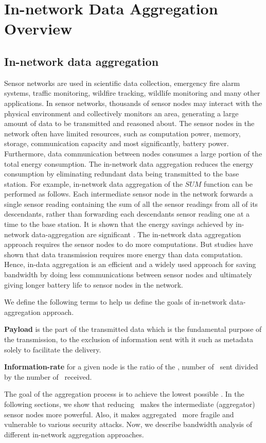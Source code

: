 \chapter{In-network Data Aggregation Overview} %
\label{cha:In-network Data-Aggregation Overview}

\section{In-network data aggregation}
	Sensor networks are used in scientific data collection, emergency fire alarm systems, traffic monitoring, wildfire tracking, wildlife monitoring and many other applications.
	In sensor networks, thousands of sensor nodes may interact with the physical environment and collectively monitors an area, generating a large amount of data to be transmitted and reasoned about.
	The sensor nodes in the network often have limited resources, such as computation power, memory, storage, communication capacity and most significantly, battery power.
	Furthermore, data communication between nodes consumes a large portion of the total energy consumption. 
	The in-network data aggregation reduces the energy consumption by eliminating redundant data being transmitted to the base station.
	For example, in-network data aggregation of the $\textit{SUM}$ function can be performed as follows. 
	Each intermediate sensor node in the network forwards a single sensor reading containing the sum of all the sensor readings from all of its descendants, rather than forwarding each descendants sensor reading one at a time to the base station.
	It is shown that the energy savings achieved by in-network data-aggregation are significant \cite{madden2002tag}.
	The in-network data aggregation approach requires the sensor nodes to do more computations.
	But studies have shown that data transmission requires more energy than data computation. 
	Hence, in-data aggregation is an efficient and a widely used approach for saving bandwidth by doing less communications between sensor nodes and ultimately giving longer battery life to sensor nodes in the network.

	We define the following terms to help us define the goals of in-network data-aggregation approach.
	\begin{definition}\label{def:payload}\cite{PayloadWiKi}
		\textbf{Payload} is the part of the transmitted data which is the fundamental purpose of the transmission, to the exclusion of information sent with it such as metadata solely to facilitate the delivery.
	\end{definition}
	\begin{definition}\label{def:information-rate}
		\textbf{Information-rate} for a given node is the ratio of the \payloads, number of \payloads\ sent divided by the number of \payloads\ received.
	\end{definition}
	The goal of the aggregation process is to achieve the lowest possible \informationRate.
	In the following sections, we show that reducing \informationRate\ makes the intermediate (aggregator) sensor nodes more powerful.
	Also, it makes aggregated \payload\ more fragile and vulnerable to various security attacks.
	Now, we describe bandwidth analysis of different in-network aggregation approaches.

